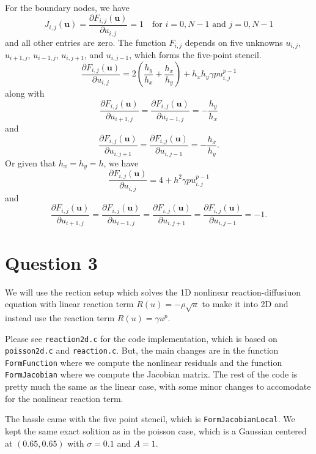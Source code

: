 \documentclass[12pt]{article}
\begin{document}
For the boundary nodes, we have
\begin{equation}
    J_{i,j}(\mathbf{u}) = \frac{\partial F_{i,j}(\mathbf{u})}{\partial u_{i,j}} = 1 \quad \text{for } i = 0, N-1 \text{ and } j = 0, N-1
\end{equation}
and all other entries are zero. The function $F_{i,j}$ depends on five unknowns $u_{i,j}$, $u_{i+1,j}$, $u_{i-1,j}$, $u_{i,j+1}$, and $u_{i,j-1}$, which forms the five-point stencil. 
\begin{equation}
\dfrac{\partial F_{i,j}(\mathbf{u})}{\partial u_{i,j}} = 2 \left(\frac{h_y}{h_x} + \frac{h_x}{h_y}\right) + h_x h_y \gamma p u_{i,j}^{p-1} 
\end{equation}
along with $$\dfrac{\partial F_{i,j}(\mathbf{u})}{\partial u_{i+1,j}} = \dfrac{\partial F_{i,j}(\mathbf{u})}{\partial u_{i-1,j}} = -\frac{h_y}{h_x}$$ and $$\dfrac{\partial F_{i,j}(\mathbf{u})}{\partial u_{i,j+1}} = \dfrac{\partial F_{i,j}(\mathbf{u})}{\partial u_{i,j-1}} = -\frac{h_x}{h_y}.$$ Or given that $h_x = h_y = h$, we have
\begin{equation}
    \dfrac{\partial F_{i,j}(\mathbf{u})}{\partial u_{i,j}} = 4 + h^2 \gamma p u_{i,j}^{p-1}
\end{equation}
and $$\dfrac{\partial F_{i,j}(\mathbf{u})}{\partial u_{i+1,j}} = \dfrac{\partial F_{i,j}(\mathbf{u})}{\partial u_{i-1,j}} = \dfrac{\partial F_{i,j}(\mathbf{u})}{\partial u_{i,j+1}} = \dfrac{\partial F_{i,j}(\mathbf{u})}{\partial u_{i,j-1}} = -1.$$

\section{Question 3}
We will use the rection setup which solves the 1D nonlinear reaction-diffusiuon equation with linear reaction term $R(u)= -\rho\sqrt{u}$ to make it into 2D and instead use the reaction term $R(u) = \gamma u^p$.

Please see \texttt{reaction2d.c} for the code implementation, which is based on \texttt{poisson2d.c} and \texttt{reaction.c}. But, the main changes are in the function \texttt{FormFunction} where we compute the nonlinear residuals and the function \texttt{FormJacobian} where we compute the Jacobian matrix. The rest of the code is pretty much the same as the linear case, with some minor changes to accomodate for the nonlinear reaction term. 

The hassle came with the five point stencil, which is \texttt{FormJacobianLocal}. We kept the same exact solition as in the poisson case, which is a Gaussian centered at $(0.65, 0.65)$ with $\sigma = 0.1$ and $A = 1$.
\end{document}
